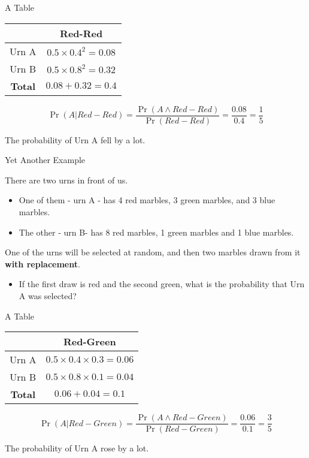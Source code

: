 \documentclass[
  ignorenonframetext,
]{beamer}
\providecommand{\tightlist}{%
  \setlength{\itemsep}{0pt}\setlength{\parskip}{0pt}}
\renewcommand{\,}{\text{, }}
\begin{document}
\begin{frame}{A Table}
\protect\hypertarget{a-table-1}{}

\begin{longtable}[]{@{}cc@{}}
\toprule
& Red-Red\tabularnewline
\midrule
\endhead
Urn A & \(0.5 \times 0.4^2 = 0.08\)\tabularnewline
Urn B & \(0.5 \times 0.8^2 = 0.32\)\tabularnewline
\textbf{Total} & \(0.08 + 0.32 = 0.4\)\tabularnewline
\bottomrule
\end{longtable}

\pause

\[
\Pr(A | Red-Red) = \frac{\Pr(A \wedge Red-Red)}{\Pr(Red-Red)} = \frac{0.08}{0.4} = \frac{1}{5}
\]

The probability of Urn A fell by a lot.

\end{frame}

\begin{frame}{Yet Another Example}
\protect\hypertarget{yet-another-example}{}

There are two urns in front of us.

\begin{itemize}
\tightlist
\item
  One of them - urn A - has 4 red marbles, 3 green marbles, and 3 blue
  marbles.
\item
  The other - urn B- has 8 red marbles, 1 green marbles and 1 blue
  marbles. \pause
\end{itemize}

One of the urns will be selected at random, and then two marbles drawn
from it \textbf{with replacement}.

\begin{itemize}
\tightlist
\item
  If the first draw is red and the second green, what is the probability
  that Urn A was selected?
\end{itemize}

\end{frame}

\begin{frame}{A Table}
\protect\hypertarget{a-table-2}{}

\begin{longtable}[]{@{}cc@{}}
\toprule
& Red-Green\tabularnewline
\midrule
\endhead
Urn A & \(0.5 \times 0.4 \times 0.3 = 0.06\)\tabularnewline
Urn B & \(0.5 \times 0.8 \times 0.1 = 0.04\)\tabularnewline
\textbf{Total} & \(0.06 + 0.04 = 0.1\)\tabularnewline
\bottomrule
\end{longtable}

\pause

\[
\Pr(A | Red-Green) = \frac{\Pr(A \wedge Red-Green)}{\Pr(Red-Green)} = \frac{0.06}{0.1} = \frac{3}{5}
\]

The probability of Urn A rose by a lot.

\end{frame}
\end{document}
